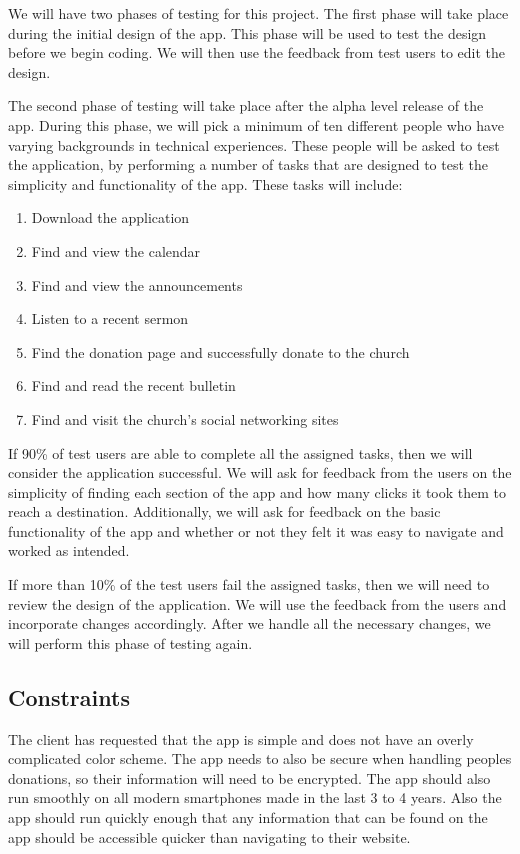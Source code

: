 \documentclass[letterpaper,10pt,draftclsnofoot,onecolumn,compsoc,titlepage]{IEEEtran}
\begin{document}
	We will have two phases of testing for this project. 
	The first phase will take place during the initial design of the app. 
	This phase will be used to test the design before we begin coding.
	We will then use the feedback from test users to edit the design.
	
	The second phase of testing will take place after the alpha level release of the app. 
	During this phase, we will pick a minimum of ten different people who have varying backgrounds in technical experiences. 
	These people will be asked to test the application, by performing a number of tasks that are designed to test the simplicity and functionality of the app. 
	These tasks will include: 
	\begin{enumerate}
		\item{Download the application}
		\item{Find and view the calendar}
		\item{Find and view the announcements}
		\item{Listen to a recent sermon}
		\item{Find the donation page and successfully donate to the church}
		\item{Find and read the recent bulletin}
		\item{Find and visit the church's social networking sites}
	\end{enumerate}
	If 90\% of test users are able to complete all the assigned tasks, then we will consider the application successful. 
	We will ask for feedback from the users on the simplicity of finding each section of the app and how many clicks it took them to reach a destination.
	Additionally, we will ask for feedback on the basic functionality of the app and whether or not they felt it was easy to navigate and worked as intended.
	
	If more than 10\% of the test users fail the assigned tasks, then we will need to review the design of the application. 
	We will use the feedback from the users and incorporate changes accordingly. 
	After we handle all the necessary changes, we will perform this phase of testing again. 

	\subsection{Constraints}
	The client has requested that the app is simple and does not have an overly complicated color scheme.
	The app needs to also be secure when handling peoples donations, so their information will need to be encrypted.
	The app should also run smoothly on all modern smartphones made in the last 3 to 4 years.
	Also the app should run quickly enough that any information that can be found on the app should be accessible quicker than navigating to their website.
\end{document}
